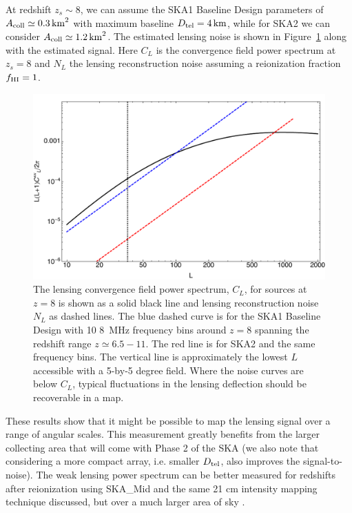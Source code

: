 \documentclass{PoS}
\begin{document}
At redshift $z_s \sim 8$, we can assume the SKA1 Baseline Design \cite{Dewdney:2013} parameters of $A_{\rm coll} \simeq 0.3  \, {\rm km}^2$ with maximum baseline $D_{\rm tel}=4 \, {\rm km}$, while for SKA2 we can consider $A_{\rm coll} \simeq 1.2  \, {\rm km}^2$.
The estimated lensing noise is shown in Figure~\ref{fig:CLNL} along with the estimated signal.  
Here $C_L$ is the convergence field power spectrum at $z_s=8$ and $N_L$ the lensing reconstruction noise assuming a reionization fraction $f_{\rm HI}=1$.
\begin{figure}[h]
\centerline{
\includegraphics[scale=0.5]{figures/tomographic_SKA_kappaPS.pdf}
}
\caption{The lensing convergence field power spectrum, $C_L$, for sources at $z=8$ is shown as a solid black line and lensing reconstruction noise $N_L$ as dashed lines.  The blue dashed curve is for the SKA1 Baseline Design with 10 8~MHz frequency bins around $z=8$ spanning the redshift range $z \simeq 6.5-11$.  The red line is for SKA2 and the same frequency bins. The vertical line is approximately the lowest $L$ accessible with a 5-by-5 degree field.  Where the noise curves are below $C_L$, typical fluctuations in the lensing deflection should be recoverable in a map. }
\label{fig:CLNL}
\end{figure}

These results show that it might be possible to map the lensing signal over a range of angular scales.  This measurement greatly benefits from the larger collecting area that will come with Phase 2 of the SKA (we also note that  considering a more compact array, i.e. smaller $D_{\rm tel}$, also improves the signal-to-noise).  The weak lensing power spectrum can be better measured for redshifts after reionization using SKA\_Mid and the same 21 cm intensity mapping technique discussed, but over a much larger area of sky \cite{PourtsidouMetcalf:2014}.
\end{document}
